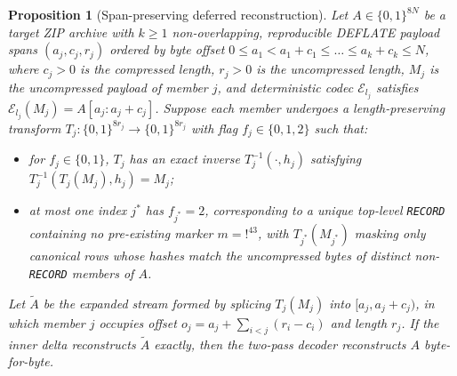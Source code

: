 \documentclass[10pt,letterpaper]{article}
\newtheorem{proposition}{Proposition}
\theoremstyle{remark}
\begin{document}
\begin{proposition}[Span-preserving deferred reconstruction]
\label{prop:exact}
Let $A \in \{0,1\}^{8N}$ be a target ZIP archive with $k \ge 1$ non-overlapping, reproducible DEFLATE payload spans $(a_j, c_j, r_j)$ ordered by byte offset $0 \le a_1 < a_1 + c_1 \le \dots \le a_k + c_k \le N$, where $c_j > 0$ is the compressed length, $r_j > 0$ is the uncompressed length, $M_j$ is the uncompressed payload of member $j$, and deterministic codec $\mathcal{E}_{l_j}$ satisfies $\mathcal{E}_{l_j}(M_j) = A[a_j : a_j + c_j]$. Suppose each member undergoes a length-preserving transform $T_j : \{0,1\}^{8r_j} \to \{0,1\}^{8r_j}$ with flag $f_j \in \{0,1,2\}$ such that:
\begin{itemize}
  \item for $f_j \in \{0,1\}$, $T_j$ has an exact inverse $T_j^{-1}(\cdot, h_j)$ satisfying $T_j^{-1}(T_j(M_j), h_j) = M_j$;
  \item at most one index $j^*$ has $f_{j^*} = 2$, corresponding to a unique top-level \texttt{RECORD} containing no pre-existing marker $m = \texttt{!}^{43}$, with $T_{j^*}(M_{j^*})$ masking only canonical rows whose hashes match the uncompressed bytes of distinct non-\texttt{RECORD} members of $A$.
\end{itemize}
Let $\widetilde{A}$ be the expanded stream formed by splicing $T_j(M_j)$ into $[a_j, a_j + c_j)$, in which member $j$ occupies offset $o_j = a_j + \sum_{i < j} (r_i - c_i)$ and length $r_j$. If the inner delta reconstructs $\widetilde{A}$ exactly, then the two-pass decoder reconstructs $A$ byte-for-byte.
\end{proposition}
\end{document}
